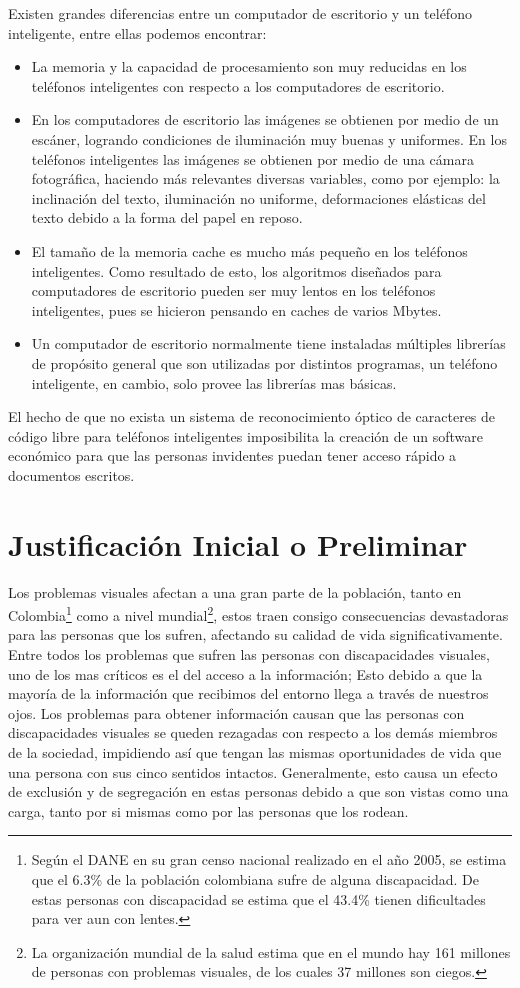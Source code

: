 \documentclass[a4paper, 11pt, oneside]{article}
\begin{document}
	Existen grandes diferencias entre un computador de escritorio y un teléfono inteligente, entre ellas podemos encontrar:
	\begin{itemize}
   \item La memoria y la capacidad de procesamiento son muy reducidas en los teléfonos inteligentes con respecto a los computadores de escritorio.
   \item En los computadores de escritorio las imágenes se obtienen por medio de un escáner, logrando condiciones de iluminación muy buenas y uniformes. En los teléfonos inteligentes las imágenes se obtienen por medio de una cámara fotográfica, haciendo más relevantes diversas variables, como por ejemplo: la inclinación del texto, iluminación no uniforme, deformaciones elásticas del texto debido a la forma del papel en reposo.
   \item El tamaño de la memoria cache es mucho más pequeño en los teléfonos inteligentes. Como resultado de esto, los algoritmos diseñados para computadores de escritorio pueden ser muy lentos en los teléfonos inteligentes, pues se hicieron pensando en caches de varios Mbytes.
	\item Un computador de escritorio normalmente tiene instaladas múltiples librerías de propósito general que son utilizadas por distintos programas, un teléfono inteligente, en cambio, solo provee las librerías mas básicas.
	\end{itemize}

	El hecho de que no exista un sistema de reconocimiento óptico de caracteres de código libre para teléfonos inteligentes imposibilita la creación de un software económico para que las personas invidentes puedan tener acceso rápido a documentos escritos.
	\clearpage
	\section{Justificación Inicial o Preliminar}
	Los problemas visuales afectan a una gran parte de la población, tanto en Colombia\footnote{Según el DANE en su gran censo nacional realizado en el año 2005, se estima que el 6.3\% de la población colombiana sufre de alguna discapacidad. De estas personas con discapacidad se estima que el 43.4\% tienen dificultades para ver aun con lentes.} como a nivel mundial\footnote{La organización mundial de la salud estima que en el mundo hay 161 millones de personas con problemas visuales, de los cuales 37 millones son ciegos.}, estos traen consigo consecuencias devastadoras para las personas que los sufren, afectando su calidad de vida significativamente. Entre todos los problemas que sufren las personas con discapacidades visuales, uno de los mas críticos es el del acceso a la información; Esto debido a que la mayoría de la información que recibimos del entorno llega a través de nuestros ojos. Los problemas para obtener información causan que las personas con discapacidades visuales se queden rezagadas con respecto a los demás miembros de la sociedad, impidiendo así que tengan las mismas oportunidades de vida que una persona con sus cinco sentidos intactos. Generalmente, esto causa un efecto de exclusión y de segregación en estas personas debido a que son vistas como una carga, tanto por si mismas como por las personas que los rodean. 
\end{document}
